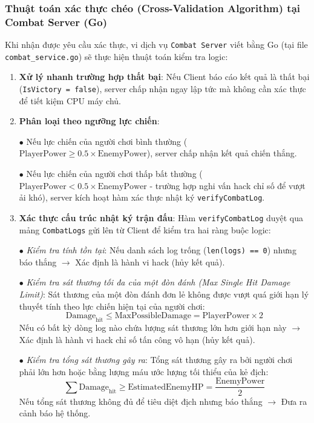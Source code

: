 \documentclass[../Project.tex]{subfiles}
\begin{document}
\subsubsection{Thuật toán xác thực chéo (Cross-Validation Algorithm) tại Combat Server (Go)}
Khi nhận được yêu cầu xác thực, vi dịch vụ \texttt{Combat Server} viết bằng Go (tại file \texttt{combat\_service.go}) sẽ thực hiện thuật toán kiểm tra logic:
\begin{enumerate}
    \item \textbf{Xử lý nhanh trường hợp thất bại}: Nếu Client báo cáo kết quả là thất bại (\texttt{IsVictory = false}), server chấp nhận ngay lập tức mà không cần xác thực để tiết kiệm CPU máy chủ.
    \item \textbf{Phân loại theo ngưỡng lực chiến}: 
    
      $\bullet$ Nếu lực chiến của người chơi bình thường (\(\text{PlayerPower} \ge 0.5 \times \text{EnemyPower}\)), server chấp nhận kết quả chiến thắng.
      
      $\bullet$ Nếu lực chiến của người chơi thấp bất thường (\(\text{PlayerPower} < 0.5 \times \text{EnemyPower}\) - trường hợp nghi vấn hack chỉ số để vượt ải khó), server kích hoạt hàm xác thực nhật ký \texttt{verify\allowbreak CombatLog}.
      
    \item \textbf{Xác thực cấu trúc nhật ký trận đấu}: Hàm \texttt{verify\allowbreak CombatLog} duyệt qua mảng \texttt{CombatLogs} gửi lên từ Client để kiểm tra hai ràng buộc logic:
    
      $\bullet$ \textit{Kiểm tra tính tồn tại}: Nếu danh sách log trống (\texttt{len(logs) == 0}) nhưng báo thắng $\rightarrow$ Xác định là hành vi hack (hủy kết quả).
      
      $\bullet$ \textit{Kiểm tra sát thương tối đa của một đòn đánh (Max Single Hit Damage Limit)}: Sát thương của một đòn đánh đơn lẻ không được vượt quá giới hạn lý thuyết tính theo lực chiến hiện tại của người chơi:
        \[ \text{Damage}_{\text{hit}} \le \text{MaxPossibleDamage} = \text{PlayerPower} \times 2 \]
        Nếu có bất kỳ dòng log nào chứa lượng sát thương lớn hơn giới hạn này $\rightarrow$ Xác định là hành vi hack chỉ số tấn công vô hạn (hủy kết quả).
        
      $\bullet$ \textit{Kiểm tra tổng sát thương gây ra}: Tổng sát thương gây ra bởi người chơi phải lớn hơn hoặc bằng lượng máu ước lượng tối thiểu của kẻ địch:
        \[ \sum \text{Damage}_{\text{hit}} \ge \text{EstimatedEnemyHP} = \frac{\text{EnemyPower}}{2} \]
        Nếu tổng sát thương không đủ để tiêu diệt địch nhưng báo thắng $\rightarrow$ Đưa ra cảnh báo hệ thống.
\end{enumerate}
\end{document}
